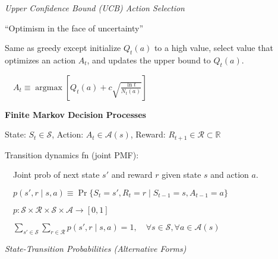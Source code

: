 \documentclass[twocolumn]{article}
\DeclareMathOperator*{\argmax}{argmax}
\begin{document}
\vspace{-.5em}
\dotfill

\textit{Upper Confidence Bound (UCB) Action Selection}

``Optimism in the face of uncertainty''

Same as greedy except initialize $Q_t(a)$ to a high value, select value that optimizes an action $A_t$, and updates the upper bound to $Q_t(a)$.

$\quad A_t \equiv \argmax \left[ Q_t(a) + c \sqrt{\frac{\ln t}{N_t(a)}} \right]$

\dotfill

\textbf{Finite Markov Decision Processes}

State: $S_t \in \mathcal{S}$, \hfill Action: $A_t \in \mathcal{A}(s)$, \hfill Reward: $R_{t+1} \in \mathcal{R} \subset \mathbb{R}$

Transition dynamics fn (joint PMF):

$\quad$Joint prob of next state $s'$ and reward $r$ given state $s$ and action $a$.

$\quad p(s', r \mid s, a) \equiv \Pr \{ S_t = s', R_t = r \mid S_{t-1} = s, A_{t-1} = a \}$

$\quad p: \mathcal S \times \mathcal R \times \mathcal S \times \mathcal A \to [0, 1]$

$\quad \sum_{s' \in \mathcal S} \sum_{r \in \mathcal R} p(s', r \mid s, a) = 1, \quad \forall s \in \mathcal S, \forall a \in \mathcal A(s)$

\vspace{-1em}\begin{figure}[h!]
    \centering
\end{figure}

\textit{State-Transition Probabilities (Alternative Forms)}
\end{document}
